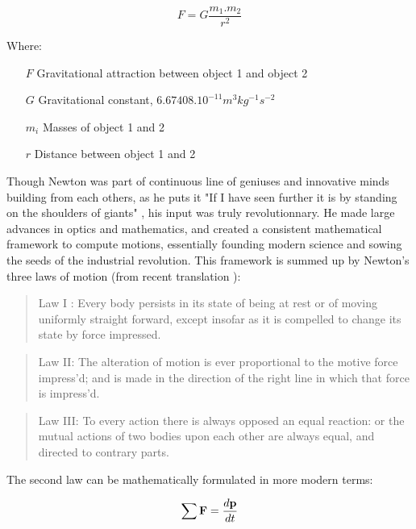 \begin{equation}
F = G \frac{m_1.m_2}{r^2}
\end{equation}


Where:
\begin{itemize}
 \setlength\itemsep{-0.5em}
  \item[$F$] Gravitational attraction between object 1 and object 2
\item[$G$] Gravitational constant, $6.67408.10^{-11} m^3 kg^{-1} s^{-2}$ \citep{Pavese2015}
\item[$m_i$] Masses of object 1 and 2
\item[$r$] Distance between object 1 and 2
\end{itemize}

Though Newton was part of continuous line of geniuses and innovative minds building from each others, as he puts it "If I have seen further it is by standing on the shoulders of giants" \citep{Maury1992}, his input was truly revolutionnary. He made large advances in optics and mathematics, and created a consistent mathematical framework to compute motions, essentially founding modern science and sowing the seeds of the industrial revolution. This framework is summed up by Newton's three laws of motion (from recent translation \citealt{Cohen1999}):

\begin{quote}
Law I : Every body persists in its state of being at rest or of moving uniformly straight forward, except insofar as it is compelled to change its state by force impressed.
\end{quote}

\begin{quote}
Law II: The alteration of motion is ever proportional to the motive force impress'd; and is made in the direction of the right line in which that force is impress'd.
\end{quote}
 
 \begin{quote}
 Law III: To every action there is always opposed an equal reaction: or the mutual actions of two bodies upon each other are always equal, and directed to contrary parts.
 \end{quote}

The second law can be mathematically formulated in more modern terms:

\begin{equation}
\sum \bold{F} = \frac{d \bold{p}}{dt}
\end{equation}

